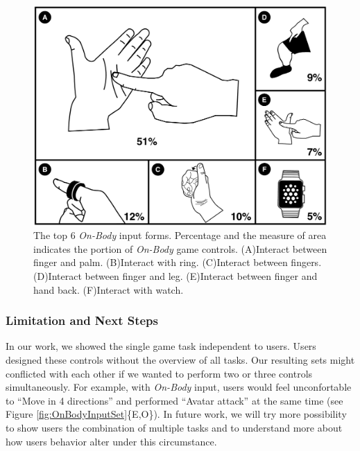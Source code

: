 \documentclass{sigchi}
\begin{document}
 \begin{figure}[!h]
  \centering
  \includegraphics[width=1\columnwidth]{OnBodyForms.pdf}
  \caption{The top 6 \emph{On-Body} input forms. Percentage and the measure of area indicates the portion of \emph{On-Body} game controls. (A)Interact between finger and palm. (B)Interact with ring. (C)Interact between fingers. (D)Interact between finger and leg. (E)Interact between finger and hand back. (F)Interact with watch.}
  \label{fig:figureOnBodyPorpotion}
  \end{figure}   

  \subsubsection{Limitation and Next Steps}

  In our work, we showed the single game task independent to users. Users designed these controls without the overview of all tasks. Our resulting sets might conflicted with each other if we wanted to perform two or three controls simultaneously. For example, with \emph{On-Body} input, users would feel unconfortable to ``Move in 4 directions'' and performed ``Avatar attack'' at the same time (see Figure \ref{fig:OnBodyInputSet}\{E,O\}). In future work, we will try more possibility to show users the combination of multiple tasks and to understand more about how users behavior alter under this circumstance.
\end{document}
